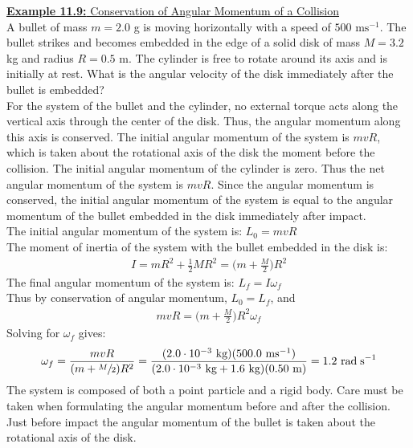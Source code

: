 \documentclass[a4paper]{article}
\let\bf\textbf
\newcommand\rads{\text{ rad\;s}^{-1}}
\newcommand\m{\text{ m}}
\newcommand\ms{\text{ ms}^{-1}}
\newcommand\kg{\text{ kg}}
\begin{document}
\newpage
\begin{shaded}
    \underline{\bf{Example 11.9:} Conservation of Angular Momentum of a Collision}
    \vspace{2mm}\\
    A bullet of mass $m = 2.0$ g is moving horizontally with a speed of $500\ms$. The bullet strikes and becomes embedded in the edge of a solid disk of mass $M = 3.2$ kg and radius $R = 0.5\m$. The cylinder is free to rotate around its axis and is initially at rest. What is the angular velocity of the disk immediately after the bullet is embedded?
    \vspace{1mm}\\
    For the system of the bullet and the cylinder, no external torque acts along the vertical axis through the center of the disk. Thus, the angular momentum along this axis is conserved. The initial angular momentum of the system is $mvR$, which is taken about the rotational axis of the disk the moment before the collision. The initial angular momentum of the cylinder is zero. Thus the net angular momentum of the system is $mvR$. Since the angular momentum is conserved, the initial angular momentum of the system is equal to the angular momentum of the bullet embedded in the disk immediately after impact.
    \vspace{1mm}\\
    The initial angular momentum of the system is: $L_0 = mvR$\\
    The moment of inertia of the system with the bullet embedded in the disk is:
    \begin{align*}
        I = mR^2 + \frac{1}{2}MR^2 = \bigg(m + \frac{M}{2}\bigg)R^2
    \end{align*}
    The final angular momentum of the system is: $L_f = I\omega_f$\\
    Thus by conservation of angular momentum, $L_0 = L_f$, and
    \begin{align*}
        mvR = \bigg(m + \frac{M}{2}\bigg)R^2\omega_f
    \end{align*}
    Solving for $\omega_f$ gives:
    \begin{align*}
        \omega_f = \frac{mvR}{(m + \sfrac{M}{2})R^2} = \frac{(2.0\cdot10^{-3}\kg)(500.0\ms)}{(2.0\cdot10^{-3}\kg + 1.6\kg)(0.50\m)} = 1.2\rads
    \end{align*}
    The system is composed of both a point particle and a rigid body. Care must be taken when formulating the angular momentum before and after the collision. Just before impact the angular momentum of the bullet is taken about the rotational axis of the disk.
\end{shaded}
\end{document}
